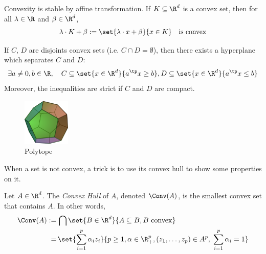 \documentclass[toc, titlepaged]{../cs-classes/cs-classes}
\begin{document}
\begin{property}
    Convexity is stable by affine transformation. If $K\subseteq\R^d$ is a convex set, then for all $\lambda\in\R$ and $\beta\in \R^d$,
    \begin{equation*}
        \lambda\cdot K+\beta := \set{\lambda\cdot x+\beta}{x\in K} \quad \textnormal{is convex}
    \end{equation*}
\end{property}

\begin{property}
    If $C$, $D$ are disjoints convex sets (i.e. $C\cap D=\emptyset$), then there exists a hyperplane which separates $C$ and $D$:
    \begin{equation*}
        \exists a\neq0, b\in\R, \quad C\subseteq\set{x\in\R^d}{a^\tp x\geq b}, D\subseteq\set{x\in\R^d}{a^\tp x\leq b}
    \end{equation*}
    Moreover, the inequalities are strict if $C$ and $D$ are compact.
\end{property}

\begin{figure}
    \centering
        \captionsetup{justification=centering}
        \includegraphics[width=0.2\textwidth]{images/polytope.png}
        \caption{Polytope}
\end{figure}
When a set is not convex, a trick is to use its convex hull to show some properties on it.
\begin{definition}
    Let $A\in\R^d$. The \emph{Convex Hull} of $A$, denoted $\Conv(A)$, is the smallest convex set that contains $A$. In other words,
    \begin{equation*}
        \begin{aligned}
            \Conv(A):=&\,\bigcap\set{B\in\R^d}{A\subseteq B, B \textnormal{ convex}}\\
            =&\,\set{\sum_{i=1}^p\alpha_iz_i}{p\geq 1, \alpha\in\R_+^p, (z_1, \dots, z_p)\in A^p, \; \sum_{i=1}^p \alpha_i=1}
        \end{aligned}
    \end{equation*}
\end{definition}
\end{document}
